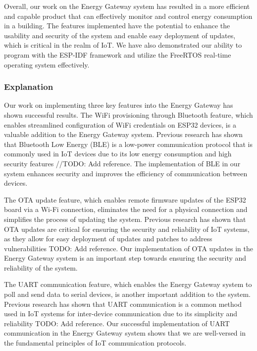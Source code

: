 Overall, our work on the Energy Gateway system has resulted in a more efficient and capable product that can effectively monitor and control energy consumption in a building. The features implemented have the potential to enhance the usability and security of the system and enable easy deployment of updates, which is critical in the realm of IoT. We have also demonstrated our ability to program with the ESP-IDF framework and utilize the FreeRTOS real-time operating system effectively.

\subsubsection{Explanation}
\label{sec:explanation}

Our work on implementing three key features into the Energy Gateway has shown successful results. The WiFi provisioning through Bluetooth feature, which enables streamlined configuration of WiFi credentials on ESP32 devices, is a valuable addition to the Energy Gateway system. Previous research has shown that Bluetooth Low Energy (BLE) is a low-power communication protocol that is commonly used in IoT devices due to its low energy consumption and high security features //TODO: Add reference. The implementation of BLE in our system enhances security and improves the efficiency of communication between devices.

The OTA update feature, which enables remote firmware updates of the ESP32 board via a Wi-Fi connection, eliminates the need for a physical connection and simplifies the process of updating the system. Previous research has shown that OTA updates are critical for ensuring the security and reliability of IoT systems, as they allow for easy deployment of updates and patches to address vulnerabilities TODO: Add reference. Our implementation of OTA updates in the Energy Gateway system is an important step towards ensuring the security and reliability of the system.

The UART communication feature, which enables the Energy Gateway system to poll and send data to serial devices, is another important addition to the system. Previous research has shown that UART communication is a common method used in IoT systems for inter-device communication due to its simplicity and reliability TODO: Add reference. Our successful implementation of UART communication in the Energy Gateway system shows that we are well-versed in the fundamental principles of IoT communication protocols.

